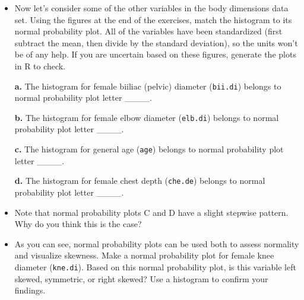 \documentclass[]{article}
\begin{document}
\begin{itemize}
\item
  Now let's consider some of the other variables in the body dimensions
  data set. Using the figures at the end of the exercises, match the
  histogram to its normal probability plot. All of the variables have
  been standardized (first subtract the mean, then divide by the
  standard deviation), so the units won't be of any help. If you are
  uncertain based on these figures, generate the plots in R to check.

  \textbf{a.} The histogram for female biiliac (pelvic) diameter
  (\texttt{bii.di}) belongs to normal probability plot letter \_\_\_\_.

  \textbf{b.} The histogram for female elbow diameter (\texttt{elb.di})
  belongs to normal probability plot letter \_\_\_\_.

  \textbf{c.} The histogram for general age (\texttt{age}) belongs to
  normal probability plot letter \_\_\_\_.

  \textbf{d.} The histogram for female chest depth (\texttt{che.de})
  belongs to normal probability plot letter \_\_\_\_.
\item
  Note that normal probability plots C and D have a slight stepwise
  pattern.\\
  Why do you think this is the case?
\item
  As you can see, normal probability plots can be used both to assess
  normality and visualize skewness. Make a normal probability plot for
  female knee diameter (\texttt{kne.di}). Based on this normal
  probability plot, is this variable left skewed, symmetric, or right
  skewed? Use a histogram to confirm your findings.
\end{itemize}
\end{document}
